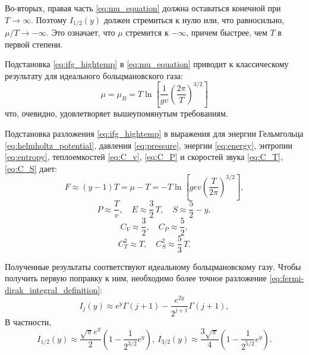 Во-вторых, правая часть \eqref{eq:mu_equation} должна оставаться конечной при $T \to \infty$.
Поэтому $I _{1 / 2} (y)$ должен стремиться к нулю или, что равносильно, $\mu / T \to -\infty$.
Это означает, что $\mu$ стремится к $-\infty$, причем быстрее, чем $T$ в первой степени.

Подстановка \eqref{eq:ifg_hightemp} в \eqref{eq:mu_equation} приводит к классическому результату для идеального больцмановского газа:
\begin{equation}
    \label{eq:mu_boltzman}
    \mu = \mu_B = T\ln\left[ \frac{1}{gv}\left( \frac{2\pi}{T} \right)^{3/2} \right]
\end{equation}
что, очевидно, удовлетворяет вышеупомянутым требованиям.

Подстановка разложения \eqref{eq:ifg_hightemp} в выражения для энергии Гельмгольца \eqref{eq:helmholtz_potential}, давления \eqref{eq:pressure}, энергии \eqref{eq:energy}, энтропии \eqref{eq:entropy}, теплоемкостей \eqref{eq:C_v}, \eqref{eq:C_P} и скоростей звука \eqref{eq:C_T}, \eqref{eq:C_S} дает:
\begin{equation}
    F\approx (y - 1)T = \mu - T = -T\ln\left[ gev\left( \frac{T}{2\pi} \right)^{3/2} \right],
\end{equation}
\begin{equation}
    P\approx \frac{T}{v},\quad
    E\approx \frac{3}{2}\,T,\quad
    S\approx \frac{5}{2} - y,
\end{equation}
\begin{equation}
    C_{V}\approx \frac{3}{2},\quad
    C_{P}\approx \frac{5}{2},
\end{equation}
\begin{equation}
    C_{T}^2\approx T,\quad
    C_{S}^2\approx \frac{5}{3}\, T.
\end{equation}

Полученные результаты соответствуют идеальному больцмановскому газу. Чтобы получить первую поправку к ним, необходимо более точное разложение \eqref{eq:fermi-dirak_integral_definition}:
\begin{equation}
    \label{eq:ifg_hightemp_precise}
    I_j(y)\approx e^y \Gamma(j + 1) - \frac{e^{2y}}{2^{j+1}}\Gamma(j + 1),
\end{equation}
В частности,
\begin{equation*}
  I_{1/2}(y)\approx \frac{\sqrt{\pi}e^y}{2}\left(
    1 - \frac{1}{2^{3/2}}e^y
  \right),\
  I_{3/2}(y)\approx \frac{3\sqrt{\pi}}{4}\left(
    1 - \frac{1}{2^{5/2}}e^y
  \right).
\end{equation*}

